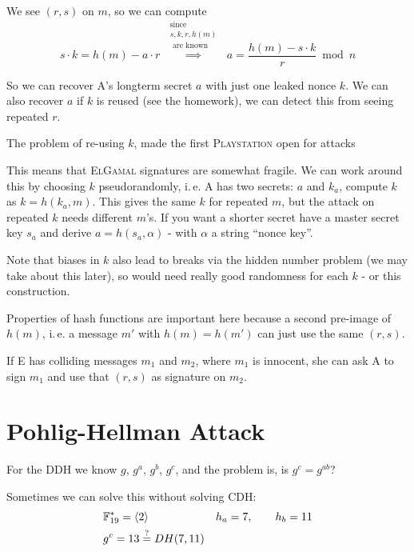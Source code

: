 We see $(r,s)$ on $m$, so we can compute
\[
	s \cdot k = h(m) - a \cdot r \,\, \overset{\substack{\text{since } \\ s, k, r, h(m) \\ \text{ are known}}}{\implies} \,\, a = \frac{h(m) - s \cdot k}{r} \bmod n
\]

So we can recover \textsc{A}'s longterm secret $a$ with just one leaked nonce $k$.
We can also recover $a$ if $k$ is reused (see the homework), we can detect this from seeing repeated $r$.

\begin{remark}
The problem of re-using $k$, made the first \textsc{Playstation} open for attacks
\end{remark}

This means that \textsc{ElGamal} signatures are somewhat fragile. We can work around this by choosing $k$ pseudorandomly, i.\,e. \textsc{A} has two secrets: $a$ and $k_a$, compute $k$ as $k = h(k_a,m)$. This gives the same $k$ for repeated $m$, but the attack on repeated $k$ needs different $m$'s. If you want a shorter secret have a master secret key $s_a$ and derive $a=h(s_a, \alpha)$ - with $\alpha$ a string ``nonce key''.

Note that biases in $k$ also lead to breaks via the hidden number problem (we may take about this later), so would need really good randomness for each $k$ - or this construction.

Properties of hash functions are important here because a second pre-image of $h(m)$, i.\,e. a message $m'$ with $h(m) = h(m')$ can just use the same $(r,s)$.

If \textsc{E} has colliding messages $m_1$ and $m_2$, where $m_1$ is innocent, she can ask \textsc{A} to sign $m_1$ and use that $(r,s)$ as signature on $m_2$.

\section{Pohlig-Hellman Attack}

For the \textsc{DDH} we know $g$, $g^a$, $g^b$, $g^c$, and the problem is, is $g^c = g^{ab}$?

Sometimes we can solve this without solving \textsc{CDH}:
\begin{align*}
&\mathbb{F}_{19}^{\ast} = \langle 2 \rangle  & h_a = 7, \qquad h_b = 11 \\
&g^c = 13 \overset{?}{=} DH(7,11) &
\end{align*}


